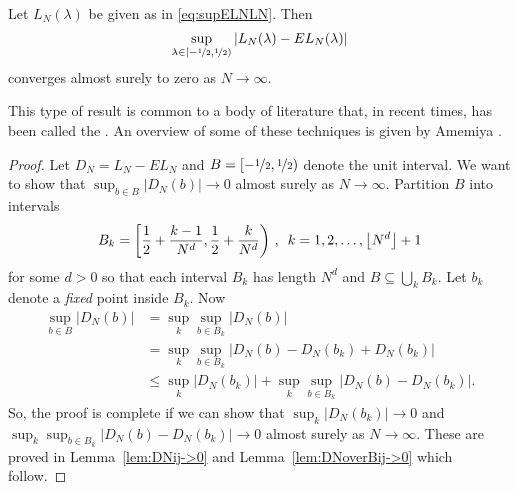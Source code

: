 \documentclass[journal]{IEEEtran}
\begin{document}
\begin{lemma}\label{lem:limsupSandES}
Let $L_N(\lambda)$ be given as in \eqref{eq:supELNLN}. Then 
\[
\sup_{\lambda \in [-\nicefrac{1}{2}, \nicefrac{1}{2})}| L_N(\lambda) - EL_N(\lambda) |
\] 
converges almost surely to zero as $N \rightarrow \infty$.
\end{lemma}
This type of result is common to a body of literature that, in recent times, has been called the . An overview of some of these techniques is given by Amemiya \cite[Ch.~4]{amemiya1985advanced}.
\begin{proof}
Let $D_N = L_N - EL_N$ and $B = [-\nicefrac{1}{2},\nicefrac{1}{2})$ denote the unit interval. We want to show that $\sup_{b \in B} \vert D_N(b) \vert \rightarrow 0$ almost surely as $N\rightarrow \infty$. Partition $B$ into intervals
\[
B_k = \left[\frac{1}{2} + \frac{k-1}{N^{d}}, \frac{1}{2} + \frac{k}{N^{d} }\right) \,, \,\,\, k = 1,2,\dots,{\left\lfloor N^d \right\rfloor} + 1
\]
for some $d > 0$ so that each interval $B_k$ has length $N^{d}$ and $B \subseteq \bigcup_{k}B_k$.  Let $b_k$ denote a \emph{fixed} point inside $B_k$. Now
\begin{align*}
\sup_{b \in B}\vert D_N(b) \vert &= \sup_{k}\sup_{b \in B_k}\vert D_N(b) \vert \\
&= \sup_{k}\sup_{b \in B_k}\vert D_N(b) - D_N(b_k) + D_N(b_k)\vert \\
&\leq \sup_{k}\vert D_N(b_k)\vert + \sup_{k}\sup_{b \in B_k}\vert D_N(b) - D_N(b_k)\vert.
\end{align*}
So, the proof is complete if we can show that $\sup_{k}\vert D_N(b_k)\vert \rightarrow 0$ and $\sup_{k}\sup_{b \in B_k}\vert D_N(b) - D_N(b_k)\vert \rightarrow 0$ almost surely as $N\rightarrow \infty$.  These are proved in Lemma~\ref{lem:DNij->0} and Lemma~\ref{lem:DNoverBij->0} which follow.
\end{proof}
\end{document}
